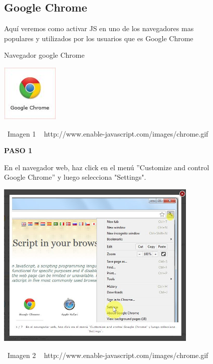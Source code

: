 \documentclass[11pt]{article} %
\begin{document}
\begin{figure}
\subsection{Google Chrome}
Aquí veremos como activar JS en uno de los navegadores mas populares y utilizados por los usuarios que es Google Chrome 


\begin{center}
\begin{center}
Navegador google Chrome

\includegraphics[height=3 cm, width=3 cm] {imagenes/chrome.jpg}
\end{center}
\ Imagen 1
\ { http://www.enable-javascript.com/images/chrome.gif }
\newline
\newline
\begin{center}

\bf PASO 1 

 En el navegador web, haz click en el menú ''Customize and control Google Chrome'' 
y luego selecciona "Settings".
\end{center}
\begin{center}
\includegraphics[height=8cm, width=8 cm] {imagenes/chrome 01.jpg}
\end{center}

\  Imagen 2
\ { http://www.enable-javascript.com/images/chrome.gif }
\newline

\end{center}
\end{figure}
\end{document}
